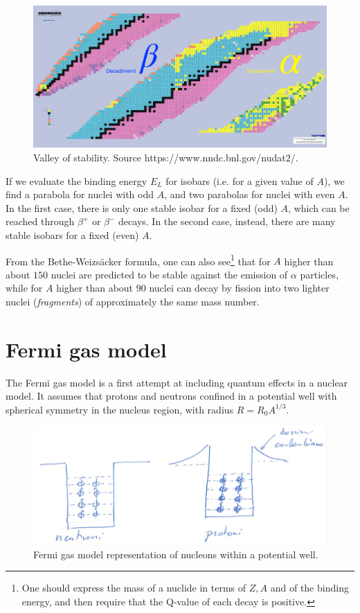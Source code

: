 \begin{figure}
    \centering
    \includegraphics[scale=0.70]{Figures/nuclear-physics-fig3}
    \caption{Valley of stability. Source https://www.nndc.bnl.gov/nudat2/.}
    \label{nuclear-physics-fig:3}
\end{figure}

If we evaluate the binding energy $E_L$ for isobars (i.e. for a given value of \(A\)), we find a parabola for nuclei with odd \(A\), and two parabolas for nuclei with even \(A\). In the first case, there is only one stable isobar for a fixed (odd) \(A\), which can be reached through \(\beta^+\) or \(\beta^-\) decays. In the second case, instead, there are many stable isobars for a fixed (even) \(A\).

From the Bethe-Weizs\"acker formula, one can also see\footnote{One should express the mass of a nuclide in terms of \(Z,A\) and of the binding energy, and then require that the Q-value of each decay is positive.} that for \(A\) higher than about \(150\) nuclei are predicted to be stable against the emission of \(\alpha\) particles, while for \(A\) higher than about \(90\) nuclei can decay by fission into two lighter nuclei (\emph{fragments}) of approximately the same mass number.

\section{Fermi gas model}
The Fermi gas model is a first attempt at including quantum effects in a nuclear model. It assumes that protons and neutrons confined in a potential well with spherical symmetry in the nucleus region, with radius $R = R_0 A^{1/3}$.
\begin{figure}[h]
    \centering
    \includegraphics[scale=0.35]{Figures/nuclear-physics-fig9}
    \caption{Fermi gas model representation of nucleons within a potential well.}
    \label{nuclear-physics-fig:9}
\end{figure}

